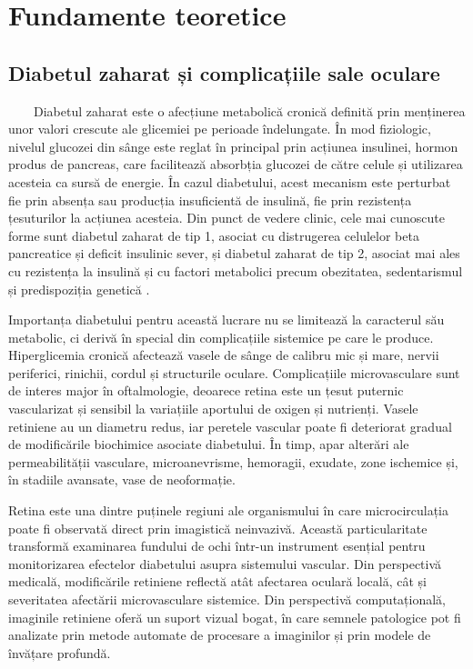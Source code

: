 \documentclass[12pt, a4paper, oneside, romanian]{teza-upb}
\begin{document}
\newpage
\mbox{}
\newpage


\chapter{Fundamente teoretice}

\section{Diabetul zaharat și complicațiile sale oculare}

\ \ \ \ Diabetul zaharat este o afecțiune metabolică cronică definită prin menținerea unor valori crescute ale glicemiei pe perioade îndelungate. În mod fiziologic, nivelul glucozei din sânge este reglat în principal prin acțiunea insulinei, hormon produs de pancreas, care facilitează absorbția glucozei de către celule și utilizarea acesteia ca sursă de energie. În cazul diabetului, acest mecanism este perturbat fie prin absența sau producția insuficientă de insulină, fie prin rezistența țesuturilor la acțiunea acesteia. Din punct de vedere clinic, cele mai cunoscute forme sunt diabetul zaharat de tip 1, asociat cu distrugerea celulelor beta pancreatice și deficit insulinic sever, și diabetul zaharat de tip 2, asociat mai ales cu rezistența la insulină și cu factori metabolici precum obezitatea, sedentarismul și predispoziția genetică \cite{17_ada2024standards}.
\bigskip

Importanța diabetului pentru această lucrare nu se limitează la caracterul său metabolic, ci derivă în special din complicațiile sistemice pe care le produce. Hiperglicemia cronică afectează vasele de sânge de calibru mic și mare, nervii periferici, rinichii, cordul și structurile oculare. Complicațiile microvasculare sunt de interes major în oftalmologie, deoarece retina este un țesut puternic vascularizat și sensibil la variațiile aportului de oxigen și nutrienți. Vasele retiniene au un diametru redus, iar peretele vascular poate fi deteriorat gradual de modificările biochimice asociate diabetului. În timp, apar alterări ale permeabilității vasculare, microanevrisme, hemoragii, exudate, zone ischemice și, în stadiile avansate, vase de neoformație.
\bigskip

Retina este una dintre puținele regiuni ale organismului în care microcirculația poate fi observată direct prin imagistică neinvazivă. Această particularitate transformă examinarea fundului de ochi într-un instrument esențial pentru monitorizarea efectelor diabetului asupra sistemului vascular. Din perspectivă medicală, modificările retiniene reflectă atât afectarea oculară locală, cât și severitatea afectării microvasculare sistemice. Din perspectivă computațională, imaginile retiniene oferă un suport vizual bogat, în care semnele patologice pot fi analizate prin metode automate de procesare a imaginilor și prin modele de învățare profundă.
\bigskip
\end{document}
